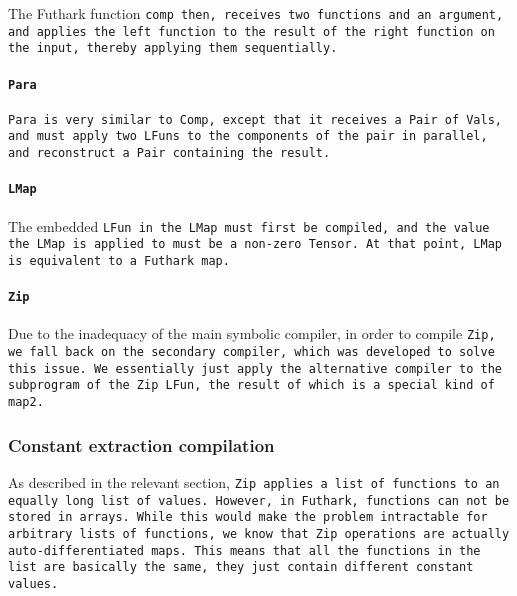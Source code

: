 
The Futhark function \tt{comp} then, receives two functions and an
argument, and applies the left function to the result of the right function
on the input, thereby applying them sequentially.

\paragraph{\tt{Para}}



\tt{Para} is very similar to \tt{Comp}, except that it receives a \tt{Pair}
of \tt{Vals}, and must apply two \tt{LFun}s to the components of the pair in
parallel, and reconstruct a \tt{Pair} containing the result.


\paragraph{\tt{LMap}}


The embedded \tt{LFun} in the \tt{LMap} must first be compiled, and the
value the \tt{LMap} is applied to must be a non-zero \tt{Tensor}. At that
point, \tt{LMap} is equivalent to a Futhark \tt{map}.

\paragraph{\tt{Zip}}

Due to the inadequacy of the main symbolic compiler, in order to compile
\tt{Zip}, we fall back on the secondary compiler, which was developed to
solve this issue. We essentially just apply the alternative compiler to
the subprogram of the \tt{Zip} \tt{LFun}, the result of which is a special
kind of map2.



\subsubsection{Constant extraction compilation}

As described in the relevant section, \tt{Zip} applies a list of functions
to an equally long list of values. However, in Futhark, functions can
not be stored in arrays. While this would make the problem intractable for
arbitrary lists of functions, we know that \tt{Zip} operations are actually
auto-differentiated maps. This means  that all the functions in the list are
basically the same, they just contain different constant values.


